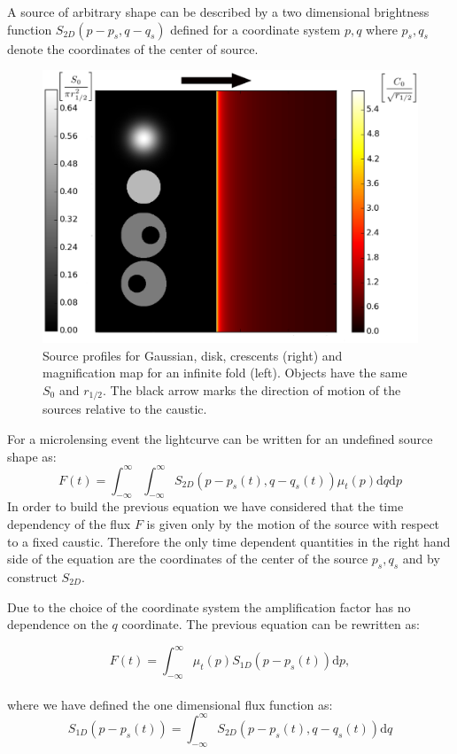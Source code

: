 A source of arbitrary shape can be described by a two dimensional brightness function $S_{2D}(p - p_s, q - q_s)$ defined for a coordinate system $p,q$ where $p_s, q_s$ denote the coordinates of the center of source.

\begin{figure}
\includegraphics[width = .49\textwidth]{plots/infinite_fold_ar.eps}
\caption{\label{fig:infinite_fold} Source profiles for Gaussian, disk,
  crescents (right) and magnification map for an infinite fold
  (left). Objects have the same $S_{0}$ and $r_{1/2}$. The black arrow marks the direction of motion of the
sources relative to the caustic.}
\end{figure}

For a microlensing event the lightcurve can be written for an
undefined source shape as:
\begin{equation}
 F(t) = \int_{-\infty}^\infty \int_{-\infty}^\infty S_{2D}(p-p_s(t), q-q_s(t)) \mu_t(p) \mathrm{d}q \mathrm{d}p
 \label{eqn:ft2d}
\end{equation}
In order to build the previous equation we have considered that the
time dependency of the flux $F$ is given only by the motion of the
source with respect to a fixed caustic. Therefore the only time
dependent quantities in the right hand side of the equation are the
coordinates of the center of the source $p_s,q_s$ and by construct
$S_{2D}$.

Due to the choice of the coordinate system the amplification factor has no dependence on the $q$ coordinate. The previous equation can be rewritten as:

\begin{equation}
 F(t) 
= \int_{-\infty}^\infty  \mu_t(p) S_{1D}\left(p-p_s(t)\right) \mathrm{d}p,
\label{eqn:ft}
\end{equation}
\\
where we have defined the one dimensional flux function as:
\begin{equation}
 S_{1D}(p-p_s(t)) = \int_{-\infty}^\infty S_{2D}(p-p_s(t), q-q_s(t)) \mathrm{d}q
\end{equation}

